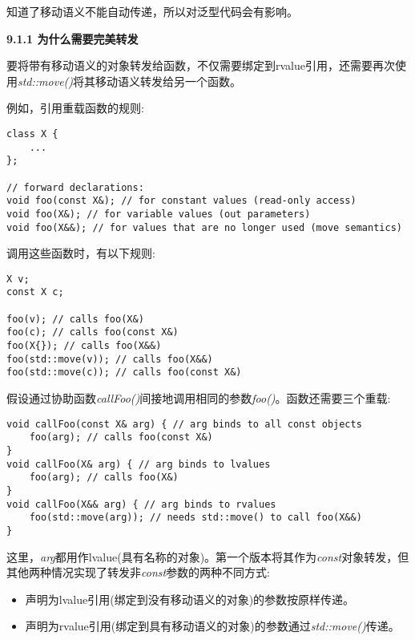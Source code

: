 知道了移动语义不能自动传递，所以对泛型代码会有影响。\par

\hspace*{\fill} \par %
\textbf{9.1.1 为什么需要完美转发}

要将带有移动语义的对象转发给函数，不仅需要绑定到rvalue引用，还需要再次使用\textit{std::move()}将其移动语义转发给另一个函数。\par

例如，引用重载函数的规则:\par

\begin{lstlisting}[caption={}]
class X {
	...
};

// forward declarations:
void foo(const X&); // for constant values (read-only access)
void foo(X&); // for variable values (out parameters)
void foo(X&&); // for values that are no longer used (move semantics)
\end{lstlisting}

调用这些函数时，有以下规则:\par

\begin{lstlisting}[caption={}]
X v;
const X c;

foo(v); // calls foo(X&)
foo(c); // calls foo(const X&)
foo(X{}); // calls foo(X&&)
foo(std::move(v)); // calls foo(X&&)
foo(std::move(c)); // calls foo(const X&)
\end{lstlisting}

假设通过协助函数\textit{callFoo()}间接地调用相同的参数\textit{foo()}。函数还需要三个重载:\par

\begin{lstlisting}[caption={}]
void callFoo(const X& arg) { // arg binds to all const objects
	foo(arg); // calls foo(const X&)
}
void callFoo(X& arg) { // arg binds to lvalues
	foo(arg); // calls foo(X&)
}
void callFoo(X&& arg) { // arg binds to rvalues
	foo(std::move(arg)); // needs std::move() to call foo(X&&)
}
\end{lstlisting}

这里，\textit{arg}都用作lvalue(具有名称的对象)。第一个版本将其作为\textit{const}对象转发，但其他两种情况实现了转发非\textit{const}参数的两种不同方式:\par

\begin{itemize}
	\item 声明为lvalue引用(绑定到没有移动语义的对象)的参数按原样传递。
	\item 声明为rvalue引用(绑定到具有移动语义的对象)的参数通过\textit{std::move()}传递。
\end{itemize}

